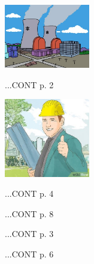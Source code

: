 \documentclass{article}
\begin{document}
\maketitle

\begin{floatingfigure}[l]{0.3\textwidth}
\includegraphics[width=0.28\textwidth]{images/img-01-06-01}
\end{floatingfigure}
\lipsum[1-2][2-15]
...CONT p. 2
\closearticle

\begin{floatingfigure}[r]{0.3\textwidth}
\includegraphics[width=0.28\textwidth]{images/img-01-06-02}
\end{floatingfigure}
\lipsum[3-4][1-23]
...CONT p. 4
\closearticle


\begin{multicols}{3}
\lipsum[6][1-4]
...CONT p. 8

\lipsum[7-8][1-11]
...CONT p. 3

\lipsum[9-10][1-3]
...CONT p. 6
\end{multicols}
\end{document}
